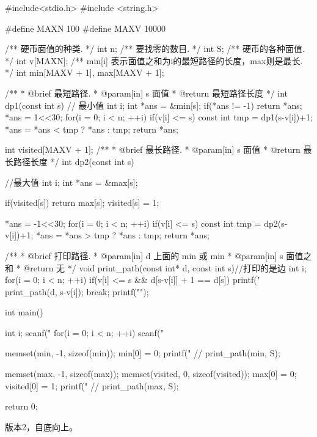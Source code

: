 \begin{Codex}[label=coin_change.c]
#include<stdio.h>
#include <string.h>

#define MAXN 100
#define MAXV 10000

/** 硬币面值的种类. */
int n;
/** 要找零的数目. */
int S;
/** 硬币的各种面值. */
int v[MAXN];
/** min[i] 表示面值之和为i的最短路径的长度，max则是最长. */
int min[MAXV + 1], max[MAXV + 1];

/**
 * @brief 最短路径.
 * @param[in] s 面值
 * @return 最短路径长度
 */
int dp1(const int s) { // 最小值
    int i;
    int *ans = &min[s];
    if(*ans != -1) return *ans;
    *ans = 1<<30;
    for(i = 0; i < n; ++i) if(v[i] <= s) {
        const int tmp = dp1(s-v[i])+1;
        *ans = *ans < tmp ? *ans : tmp;
    }
    return *ans;
}

int visited[MAXV + 1];
/**
 * @brief 最长路径.
 * @param[in] s 面值
 * @return 最长路径长度
 */
int dp2(const int s) { //最大值 
    int i;
    int *ans = &max[s];

    if(visited[s]) return max[s];
    visited[s] = 1;

    *ans = -1<<30;
    for(i = 0; i < n; ++i) if(v[i] <= s) {
        const int tmp = dp2(s-v[i])+1;
        *ans = *ans > tmp ? *ans : tmp;
    }
    return *ans;
}

/**
 * @brief 打印路径.
 * @param[in] d 上面的 min 或 min
 * @param[in] s 面值之和
 * @return 无
 */
void print_path(const int* d, const int s){//打印的是边
    int i;
    for(i = 0; i < n; ++i) if(v[i] <= s && d[s-v[i]] + 1 == d[s]) {
        printf("%
        print_path(d, s-v[i]);
        break;
    }
    printf("\n");
}

int main() {
    int i;
    scanf("%
    for(i = 0; i < n; ++i) scanf("%

    memset(min, -1, sizeof(min));
    min[0] = 0;
    printf("%
    // print_path(min, S);

    memset(max, -1, sizeof(max));
    memset(visited, 0, sizeof(visited));
    max[0] = 0; visited[0] = 1;
    printf("%
    // print_path(max, S);

    return 0;
}
\end{Codex}

版本2，自底向上。

